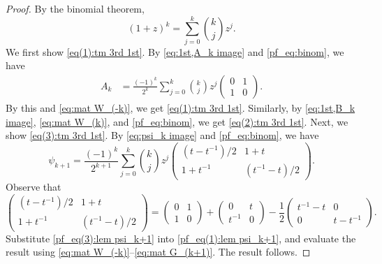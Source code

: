 \documentclass[11pt]{article}%
\theoremstyle{definition}
\theoremstyle{plain}
\begin{document}
\begin{proof}
By the binomial theorem,
\begin{equation}\label{pf_eq:binom}
	(1+z)^k=\sum_{j=0}^k {k\choose j}z^j.
\end{equation}
We first show \eqref{eq(1):tm 3rd 1st}.
By \eqref{eq:1st,A_k image} and \eqref{pf_eq:binom}, we have
\begin{align*}
	A_k 
	& =  \frac{(-1)^k}{2^k} \sum_{j=0}^k {k \choose j} z^j \begin{pmatrix} 0 & 1 \\ 1 & 0 \end{pmatrix}.
\end{align*}
By this and \eqref{eq:mat W_(-k)}, we get \eqref{eq(1):tm 3rd 1st}.
Similarly, by \eqref{eq:1st,B_k image}, \eqref{eq:mat W_(k)}, and \eqref{pf_eq:binom}, we get \eqref{eq(2):tm 3rd 1st}.
Next, we show \eqref{eq(3):tm 3rd 1st}.
By \eqref{eq:psi_k image} and \eqref{pf_eq:binom}, we have
\begin{equation}\label{pf_eq(1):lem psi_k+1}
	\psi_{k+1} = \frac{(-1)^k}{2^{k+1}} \sum_{j=0}^k {k \choose j} z^j 
	\begin{pmatrix} 
	(t - t^{-1})/2 & 1 + t \\[2pt] 
	1 + t^{-1} & (t^{-1} - t)/2
	\end{pmatrix}.
\end{equation}
Observe that
\begin{equation}\label{pf_eq(3):lem psi_k+1}
	\begin{pmatrix} 
	(t - t^{-1})/2 & 1 + t \\[2pt] 
	1 + t^{-1} & (t^{-1} - t)/2
	\end{pmatrix}
	= 
	\begin{pmatrix} 
	0 & 1 \\[2pt]
	1 & 0
	\end{pmatrix}
	+
	\begin{pmatrix} 
	0 & t \\[2pt] 
	t^{-1} & 0
	\end{pmatrix}
	-
	\frac{1}{2}\begin{pmatrix} 
	t^{-1} - t & 0 \\[2pt] 
	0 & t - t^{-1}
	\end{pmatrix}.				
\end{equation}
Substitute \eqref{pf_eq(3):lem psi_k+1} into \eqref{pf_eq(1):lem psi_k+1}, and evaluate the result using \eqref{eq:mat W_(-k)}--\eqref{eq:mat G_(k+1)}.
The result follows.
\end{proof}
\end{document}

